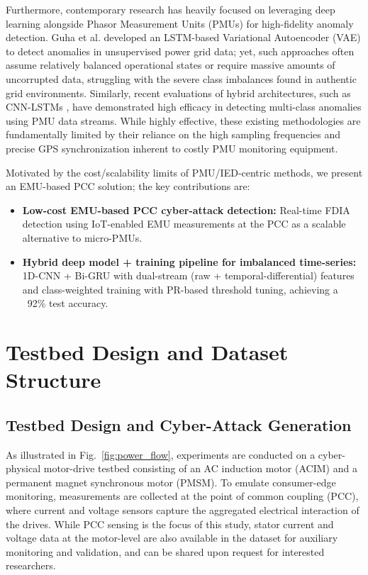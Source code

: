 \documentclass[conference,onecolumn,letterpaper,romanappendices,12pt,english,nofonttune]{IEEEtran}
\begin{document}
Furthermore, contemporary research has heavily focused on leveraging deep learning alongside Phasor Measurement Units (PMUs) for high-fidelity anomaly detection. Guha et al. \cite{guha} developed an LSTM-based Variational Autoencoder (VAE) to detect anomalies in unsupervised power grid data; yet, such approaches often assume relatively balanced operational states or require massive amounts of uncorrupted data, struggling with the severe class imbalances found in authentic grid environments. Similarly, recent evaluations of hybrid architectures, such as CNN-LSTMs \cite{pmu_lstm_2025}, have demonstrated high efficacy in detecting multi-class anomalies using PMU data streams. While highly effective, these existing methodologies are fundamentally limited by their reliance on the high sampling frequencies and precise GPS synchronization inherent to costly PMU monitoring equipment. 

Motivated by the cost/scalability limits of PMU/IED-centric methods, we present an EMU-based PCC solution; the key contributions are:
\begin{itemize}
    \item \textbf{Low-cost EMU-based PCC cyber-attack detection:} Real-time FDIA detection using IoT-enabled EMU measurements at the PCC as a scalable alternative to micro-PMUs.
    \item \textbf{Hybrid deep model + training pipeline for imbalanced time-series:} 1D-CNN + Bi-GRU with dual-stream (raw + temporal-differential) features and class-weighted training with PR-based threshold tuning, achieving a ~92\% test accuracy.
\end{itemize}

\section{Testbed Design and Dataset Structure}

\subsection{Testbed Design and Cyber-Attack Generation}
As illustrated in Fig.~\ref{fig:power_flow}, experiments are conducted on a cyber-physical motor-drive testbed consisting of an AC induction motor (ACIM)  and a permanent magnet synchronous motor (PMSM). To emulate consumer-edge monitoring, measurements are collected at the point of common coupling (PCC), where current and voltage sensors capture the aggregated electrical interaction of the drives. 
While PCC sensing is the focus of this study, stator current and voltage data at the motor-level are also available in the dataset for auxiliary monitoring and validation, and can be shared upon request for interested researchers.
\end{document}
